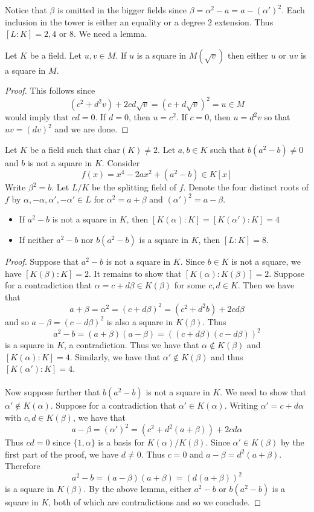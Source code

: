 \documentclass[a4paper]{article}
\begin{document}
Notice that $\beta$ is omitted in the bigger fields since $\beta=\alpha^2-a=a-(\alpha')^2$. Each inclusion in the tower is either an equality or a degree $2$ extension. Thus $[L:K]=2,4$ or $8$. We need a lemma. 

\begin{lmm}{}{} Let $K$ be a field. Let $u,v\in M$. If $u$ is a square in $M(\sqrt{v})$ then either $u$ or $uv$ is a square in $M$. \tcbline
\begin{proof}
This follows since $$(c^2+d^2v)+2cd\sqrt{v}=(c+d\sqrt{v})^2=u\in M$$ would imply that $cd=0$. If $d=0$, then $u=c^2$. If $c=0$, then $u=d^2v$ so that $uv=(dv)^2$ and we are done. 
\end{proof}
\end{lmm}

\begin{prp}{}{} Let $K$ be a field such that $\text{char}(K)\neq 2$. Let $a,b\in K$ such that $b(a^2-b)\neq 0$ and $b$ is not a square in $K$. Consider $$f(x)=x^4-2ax^2+(a^2-b)\in K[x]$$ Write $\beta^2=b$. Let $L/K$ be the splitting field of $f$. Denote the four distinct roots of $f$ by $\alpha,-\alpha,\alpha',-\alpha'\in L$ for $\alpha^2=a+\beta$ and $(\alpha')^2=a-\beta$. 
\begin{itemize}
\item If $a^2-b$ is not a square in $K$, then $[K(\alpha):K]=[K(\alpha'):K]=4$
\item If neither $a^2-b$ nor $b(a^2-b)$ is a square in $K$, then $[L:K]=8$. 
\end{itemize} \tcbline
\begin{proof}
Suppose that $a^2-b$ is not a square in $K$. Since $b\in K$ is not a square, we have $[K(\beta):K]=2$. It remains to show that $[K(\alpha):K(\beta)]=2$. Suppose for a contradiction that $\alpha=c+d\beta\in K(\beta)$ for some $c,d\in K$. Then we have that $$a+\beta=\alpha^2=(c+d\beta)^2=(c^2+d^2b)+2cd\beta$$ and so $a-\beta=(c-d\beta)^2$ is also a square in $K(\beta)$. Thus $$a^2-b=(a+\beta)(a-\beta)=((c+d\beta)(c-d\beta))^2$$ is a square in $K$, a contradiction. Thus we have that $\alpha\notin K(\beta)$ and $[K(\alpha):K]=4$. Similarly, we have that $\alpha'\notin K(\beta)$ and thus $[K(\alpha'):K]=4$. \\~\\

Now suppose further that $b(a^2-b)$ is not a square in $K$. We need to show that $\alpha'\notin K(\alpha)$. Suppose for a contradiction that $\alpha'\in K(\alpha)$. Writing $\alpha'=c+d\alpha$ with $c,d\in K(\beta)$, we have that $$a-\beta=(\alpha')^2=(c^2+d^2(a+\beta))+2cd\alpha$$ Thus $cd=0$ since $\{1,\alpha\}$ is a basis for $K(\alpha)/K(\beta)$. Since $\alpha'\in K(\beta)$ by the first part of the proof, we have $d\neq 0$. Thus $c=0$ and $a-\beta=d^2(a+\beta)$. Therefore $$a^2-b=(a-\beta)(a+\beta)=(d(a+\beta))^2$$ is a square in $K(\beta)$. By the above lemma, either $a^2-b$ or $b(a^2-b)$ is a square in $K$, both of which are contradictions and so we conclude. 
\end{proof}
\end{prp}
\end{document}

